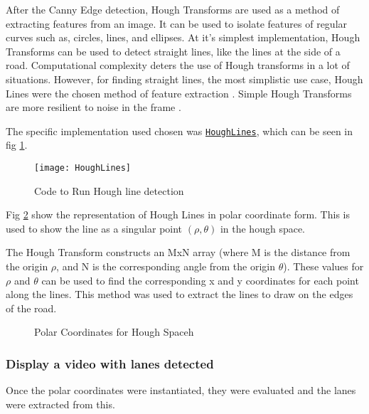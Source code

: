 \documentclass[conference]{IEEEtran}
\begin{document}
After the Canny Edge detection, Hough Transforms are used as a method of extracting features from an image. It can be used to isolate features of regular curves such as, circles, lines, and ellipses. At it's simplest implementation, Hough Transforms can be used to detect straight lines, like the lines at the side of a road. Computational complexity deters the use of Hough transforms in a lot of situations. However, for finding straight lines, the most simplistic use case, Hough Lines were the chosen method of feature extraction \cite{Hough_Transform}. Simple Hough Transforms are more resilient to noise in the frame \cite{Hough_Lines_Better_Against_Noise}.

The specific implementation used chosen was \href{https://docs.opencv.org/3.4/d9/db0/tutorial_hough_lines.html}{\texttt{HoughLines}}, which can be seen in fig \ref{fig:HoughLines}.

\begin{figure}[H]
\centerline{\texttt{[image: HoughLines]}}
\caption{Code to Run Hough line detection}
\label{fig:HoughLines}
\end{figure}

Fig \ref{fig:Polar_Coordinates_for_Hough_transforms} show the representation of Hough Lines in polar coordinate form. This is used to show the line as a singular point $(\rho, \theta)$ in the hough space. 

The Hough Transform constructs an MxN array (where M is the distance from the origin $\rho$, and N is the corresponding angle from the origin $\theta$). These values for $\rho$ and $\theta$ can be used to find the corresponding x and y coordinates for each point along the lines. This method was used to extract the lines to draw on the edges of the road. 

\begin{figure}[H]
\centering
{}
\caption{Polar Coordinates for Hough Spaceh}
\label{fig:Polar_Coordinates_for_Hough_transforms}
\end{figure} 

\subsubsection{Display a video with lanes detected}

Once the polar coordinates were instantiated, they were evaluated and the lanes were extracted from this. 
\end{document}
